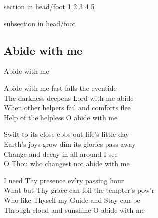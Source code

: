 \documentclass{beamer}
\begin{document}
{
{ 
 {
 \begin{beamercolorbox}[ht=4.5ex,dp=1.5ex,%
      leftskip=.3cm,rightskip=.3cm plus1fil]{section in head/foot}
 \fontsize{12}{25}\selectfont 
\hyperlink{Abide with me[]1}{1}
\hyperlink{Abide with me[]2}{2}
\hyperlink{Abide with me[]3}{3}
\hyperlink{Abide with me[]4}{4}
\hyperlink{Abide with me[]5}{5}
 
 \end{beamercolorbox}%
  \begin{beamercolorbox}[ht=2.5ex,dp=1.125ex,%
   leftskip=.3cm,rightskip=.3cm plus1fil]{subsection in head/foot}
   \insertauthor
 \end{beamercolorbox}%
 }
}
\subsection{ Abide with me }

\hypertarget{Abide with me[]1}{}
\begin{frame}{Abide with me }
\fontsize{ 15 }{ 19 }\selectfont

Abide with me fast falls the eventide\\ 
The darkness deepens Lord with me abide\\ 
When other helpers fail and comforts flee\\ 
Help of the helpless O abide with me 

\end{frame}

\hypertarget{Abide with me[]2}{}
\begin{frame}{}
\fontsize{ 15 }{ 19 }\selectfont

Swift to its close ebbs out life's little day\\ 
Earth's joys grow dim its glories pass away\\ 
Change and decay in all around I see\\ 
O Thou who changest not abide with me 

\end{frame}

\hypertarget{Abide with me[]3}{}
\begin{frame}{}
\fontsize{ 15 }{ 19 }\selectfont

I need Thy presence ev'ry passing hour\\ 
What but Thy grace can foil the tempter's pow'r\\ 
Who like Thyself my Guide and Stay can be\\ 
Through cloud and sunshine O abide with me 


\end{frame}}
\end{document}

